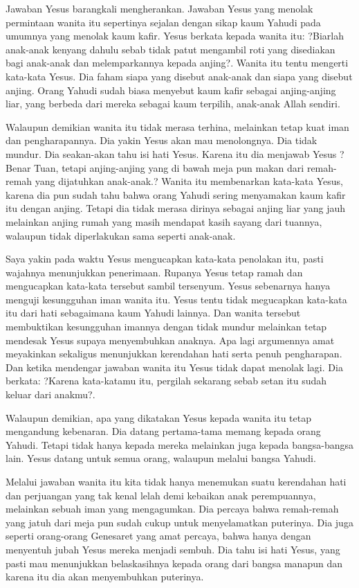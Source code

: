 \documentclass[a4paper,12pt]{article}
\begin{document}
Jawaban Yesus barangkali mengherankan. Jawaban Yesus yang menolak permintaan wanita itu sepertinya sejalan dengan sikap kaum Yahudi pada umumnya yang menolak kaum kafir. Yesus berkata kepada wanita itu: ?Biarlah anak-anak kenyang dahulu sebab tidak patut mengambil roti yang disediakan bagi anak-anak dan melemparkannya kepada anjing?. Wanita itu tentu mengerti kata-kata Yesus. Dia faham siapa yang disebut anak-anak dan siapa yang disebut anjing. Orang Yahudi sudah biasa menyebut kaum kafir sebagai anjing-anjing liar, yang berbeda dari mereka sebagai kaum terpilih, anak-anak Allah sendiri.

Walaupun demikian wanita itu tidak merasa terhina, melainkan tetap kuat iman dan pengharapannya. Dia yakin Yesus akan mau menolongnya. Dia tidak mundur. Dia seakan-akan tahu isi hati Yesus. Karena itu dia menjawab Yesus ?Benar Tuan, tetapi anjing-anjing yang di bawah meja pun makan dari remah-remah yang dijatuhkan anak-anak.? Wanita itu membenarkan kata-kata Yesus, karena dia pun sudah tahu bahwa orang Yahudi sering menyamakan kaum kafir itu dengan anjing. Tetapi dia tidak merasa dirinya sebagai anjing liar yang jauh melainkan anjing rumah yang masih mendapat kasih sayang dari tuannya, walaupun tidak diperlakukan sama seperti anak-anak.

Saya yakin pada waktu Yesus mengucapkan kata-kata penolakan itu, pasti wajahnya menunjukkan penerimaan. Rupanya Yesus tetap ramah dan mengucapkan kata-kata tersebut sambil tersenyum. Yesus sebenarnya hanya menguji kesungguhan iman wanita itu. Yesus tentu tidak megucapkan kata-kata itu dari hati sebagaimana kaum Yahudi lainnya. Dan wanita tersebut membuktikan kesungguhan imannya dengan tidak mundur melainkan tetap mendesak Yesus supaya menyembuhkan anaknya. Apa lagi argumennya amat meyakinkan sekaligus menunjukkan kerendahan hati serta penuh pengharapan. Dan ketika mendengar jawaban wanita itu Yesus tidak dapat menolak lagi. Dia berkata: ?Karena kata-katamu itu, pergilah sekarang sebab setan itu sudah keluar dari anakmu?.

Walaupun demikian, apa yang dikatakan Yesus kepada wanita itu tetap mengandung kebenaran. Dia datang pertama-tama memang kepada orang Yahudi. Tetapi tidak hanya kepada mereka melainkan juga kepada bangsa-bangsa lain. Yesus datang untuk semua orang, walaupun melalui bangsa Yahudi.

Melalui jawaban wanita itu kita tidak hanya menemukan suatu kerendahan hati dan perjuangan yang tak kenal lelah demi kebaikan anak perempuannya, melainkan sebuah iman yang mengagumkan. Dia percaya bahwa remah-remah yang jatuh dari meja pun sudah cukup untuk menyelamatkan puterinya. Dia juga seperti orang-orang Genesaret yang amat percaya, bahwa hanya dengan menyentuh jubah Yesus mereka menjadi sembuh. Dia tahu isi hati Yesus, yang pasti mau menunjukkan belaskasihnya kepada orang dari bangsa manapun dan karena itu dia akan menyembuhkan puterinya.
\end{document}
